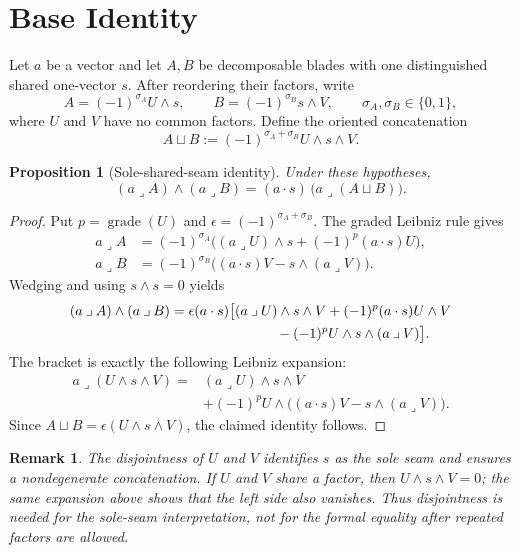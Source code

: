 \documentclass[11pt]{article}
\newtheorem{proposition}{Proposition}
\newtheorem{remark}{Remark}
\begin{document}
\section{Base Identity}

Let \(a\) be a vector and let \(A,B\) be decomposable blades with one
distinguished shared one-vector \(s\). After reordering their factors, write
\[
  A=(-1)^{\sigma_A}U\wedge s,\qquad
  B=(-1)^{\sigma_B}s\wedge V,
  \qquad \sigma_A,\sigma_B\in\{0,1\},
\]
where \(U\) and \(V\) have no common factors. Define the oriented concatenation
\[
  A\sqcup B :=
  (-1)^{\sigma_A+\sigma_B}U\wedge s\wedge V .
\]

\begin{proposition}[Sole-shared-seam identity]
\label{prop:base-identity}
Under these hypotheses,
\[
  (a\mathbin{\lrcorner} A)\wedge(a\mathbin{\lrcorner} B)
  =
  (a\cdot s)\,
  \bigl(a\mathbin{\lrcorner}(A\sqcup B)\bigr).
\]
\end{proposition}

\begin{proof}
Put \(p=\operatorname{grade}(U)\) and
\(\epsilon=(-1)^{\sigma_A+\sigma_B}\). The graded Leibniz rule gives
\[
\begin{aligned}
a\mathbin{\lrcorner}A
 &=(-1)^{\sigma_A}
   \bigl((a\mathbin{\lrcorner}U)\wedge s
   +(-1)^p(a\cdot s)U\bigr),\\
a\mathbin{\lrcorner}B
 &=(-1)^{\sigma_B}
   \bigl((a\cdot s)V-s\wedge(a\mathbin{\lrcorner}V)\bigr).
\end{aligned}
\]
Wedging and using \(s\wedge s=0\) yields
\[
\begin{aligned}
(a\mathbin{\lrcorner}A)\wedge(a\mathbin{\lrcorner}B)
={}&\epsilon(a\cdot s)\bigl[
  (a\mathbin{\lrcorner}U)\wedge s\wedge V
 +(-1)^p(a\cdot s)U\wedge V\\
&\hspace{2.2cm}
 -(-1)^pU\wedge s\wedge(a\mathbin{\lrcorner}V)
\bigr].
\end{aligned}
\]
The bracket is exactly the following Leibniz expansion:
\[
\begin{aligned}
a\mathbin{\lrcorner}(U\wedge s\wedge V)
={}&(a\mathbin{\lrcorner}U)\wedge s\wedge V\\
&+(-1)^pU\wedge
\bigl((a\cdot s)V-s\wedge(a\mathbin{\lrcorner}V)\bigr).
\end{aligned}
\]
Since \(A\sqcup B=\epsilon(U\wedge s\wedge V)\), the claimed identity follows.
\end{proof}

\begin{remark}
The disjointness of \(U\) and \(V\) identifies \(s\) as the sole seam and
ensures a nondegenerate concatenation. If \(U\) and \(V\) share a factor,
then \(U\wedge s\wedge V=0\); the same expansion above shows that the left
side also vanishes. Thus disjointness is needed for the sole-seam
interpretation, not for the formal equality after repeated factors are
allowed.
\end{remark}
\end{document}
